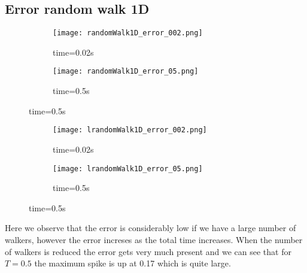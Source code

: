 \documentclass[a4paper,11pt]{article}
\begin{document}
\subsection{Error random walk 1D }
    \begin{figure}[H]
        \caption{Error random walk model $10^6$ walkers $\Delta t=0.00005$}
        \captionsetup[subfigure]{labelformat=empty}
        \begin{subfigure}[b!]{0.55\textwidth}
            \texttt{[image: randomWalk1D\_error\_002.png]}
            \caption{time=0.02s}
        \end{subfigure}
        \begin{subfigure}[b!]{0.55\textwidth}
            \texttt{[image: randomWalk1D\_error\_05.png]}
            \caption{time=0.5s}
        \end{subfigure}
    \end{figure}
    \begin{figure}[H]
        \caption{Error random walk model $10^4$ walkers $\Delta t=0.0005$}
        \captionsetup[subfigure]{labelformat=empty}
        \begin{subfigure}[b!]{0.55\textwidth}
            \texttt{[image: lrandomWalk1D\_error\_002.png]}
            \caption{time=0.02s}
        \end{subfigure}
        \begin{subfigure}[b!]{0.55\textwidth}
            \texttt{[image: lrandomWalk1D\_error\_05.png]}
            \caption{time=0.5s}
        \end{subfigure}
    \end{figure}
    
    Here we observe that the error is considerably low if we have a large number of walkers, however the error increses as the total time increases. When the number of walkers is reduced the error gets very much present and we can see that for $T=0.5$ the maximum spike is up at 0.17 which is quite large.
\end{document}
